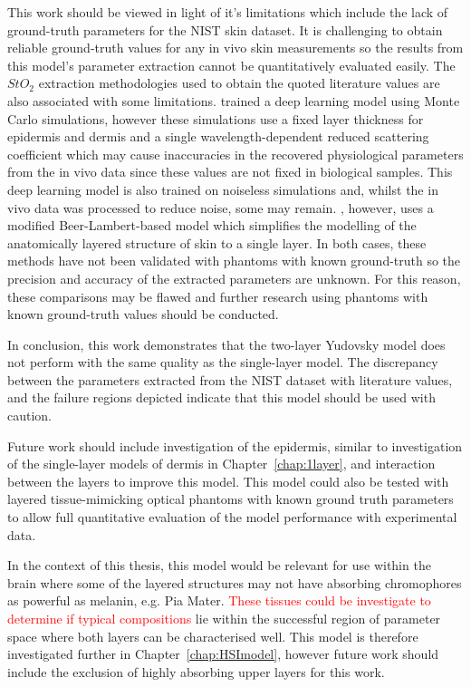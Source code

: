 This work should be viewed in light of it's limitations which include the lack of ground-truth parameters for the NIST skin dataset. It is challenging to obtain reliable ground-truth values for any in vivo skin measurements so the results from this model's parameter extraction cannot be quantitatively evaluated easily. The $StO_2$ extraction methodologies used to obtain the quoted literature values are also associated with some limitations. \citet{Nishidate2011} trained a deep learning model using Monte Carlo simulations, however these simulations use a fixed layer thickness for epidermis and dermis and a single wavelength-dependent reduced scattering coefficient which may cause inaccuracies in the recovered physiological parameters from the in vivo data since these values are not fixed in biological samples. This deep learning model is also trained on noiseless simulations and, whilst the in vivo data was processed to reduce noise, some may remain. \citet{VanManen2021}, however, uses a modified Beer-Lambert-based model which simplifies the modelling of the anatomically layered structure of skin to a single layer. In both cases, these methods have not been validated with phantoms with known ground-truth so the precision and accuracy of the extracted parameters are unknown. For this reason, these comparisons may be flawed and further research using phantoms with known ground-truth values should be conducted.

In conclusion, this work demonstrates that the two-layer Yudovsky model does not perform with the same quality as the single-layer model. The discrepancy between the parameters extracted from the NIST dataset with literature values, and the failure regions depicted indicate that this model should be used with caution. 

Future work should include investigation of the epidermis, similar to investigation of the single-layer models of dermis in Chapter~\ref{chap:1layer}, and interaction between the layers to improve this model. This model could also be tested with layered tissue-mimicking optical phantoms with known ground truth parameters to allow full quantitative evaluation of the model performance with experimental data. 

In the context of this thesis, this model would be relevant for use within the brain where some of the layered structures may not have absorbing chromophores as powerful as melanin, e.g. Pia Mater. \textcolor{red}{These tissues could be investigate to determine if typical compositions} lie within the successful region of parameter space where both layers can be characterised well. This model is therefore investigated further in Chapter~\ref{chap:HSImodel}, however future work should include the exclusion of highly absorbing upper layers for this work. 

